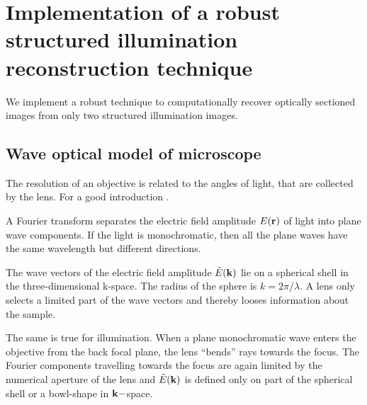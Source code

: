 

\newcommand{\avg}[1]{\langle #1 \rangle}

\chapter{Implementation of a robust structured illumination
  reconstruction technique}
\label{sec:app_hilo}
\begin{summary}
  We implement a robust technique to computationally recover optically
  sectioned images from only two structured illumination images.
\end{summary}
\section{Wave optical model of microscope}
The resolution of an objective is related to the angles of light, that
are collected by the lens. For a good introduction
\citet[see][]{Gustafssona}.

A Fourier transform separates the electric field amplitude $E(\mathbf{r})$ of
light into plane wave components. If the light is monochromatic, then
all the plane waves have the same wavelength but different directions.

The wave vectors of the electric field amplitude $\tilde E(\mathbf{k})$ lie on
a spherical shell in the three-dimensional k-space. The radius of the
sphere is $k=2\pi/\lambda$. A lens only selects a limited part of the
wave vectors and thereby looses information about the sample.

The same is true for illumination. When a plane monochromatic wave
enters the objective from the back focal plane, the lens ``bends''
rays towards the focus. The Fourier components travelling towards the
focus are again limited by the numerical aperture of the lens and
$\tilde E(\mathbf{k})$ is defined only on part of the spherical shell or a
bowl-shape in $\mathbf{k}-$space.

